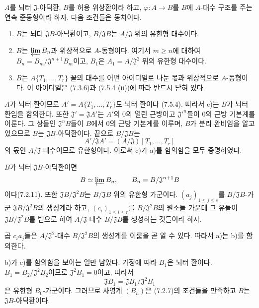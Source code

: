 \begin{proposition}[7.5.5]
\label{0.7.5.5-ko}
$A$를 뇌터 $\mathfrak J$-아딕환, $B$를 허용 위상환이라 하고,
$\varphi:A\to B$를 $B$에 $A$-대수 구조를 주는 연속 준동형이라
하자. 다음 조건들은 동치이다.
\begin{enumerate}
  \item[a)] $B$는 뇌터 $\mathfrak JB$-아딕환이고,
    $B/\mathfrak JB$는 $A/\mathfrak J$ 위의 유한형 대수이다.

  \item[b)] $B$는 $\varprojlim B_n$과 위상적으로 $A$-동형이다.
    여기서 $m\geq n$에 대하여
    $B_n=B_m/\mathfrak J^{n+1}B_m$이고, $B_1$은
    $A_1=A/\mathfrak J^2$ 위의 유한형 대수이다.

  \item[c)] $B$는 $A\{T_1,\ldots,T_r\}$ 꼴의 대수를 어떤
    아이디얼로 나눈 몫과 위상적으로 $A$-동형이다. 이 아이디얼은
    (7.3.6)과 (7.5.4 (ii))에 따라 반드시 닫혀 있다.
\end{enumerate}
\end{proposition}

$A$가 뇌터 환이므로 $A'=A\{T_1,\ldots,T_r\}$도 뇌터 환이다
(7.5.4). 따라서 c)는 $B$가 뇌터 환임을 함의한다. 또한
$\mathfrak J'=\mathfrak JA'$는 $A'$의 $0$의 열린 근방이고
$\mathfrak J'^{n}$들이 $0$의 근방 기본계를 이룬다. 그 상들인
$\mathfrak J^nB$들이 $B$에서 $0$의 근방 기본계를 이루며, $B$가
분리 완비임을 알고 있으므로 $B$는 $\mathfrak JB$-아딕환이다.
끝으로 $B/\mathfrak JB$는
\[
  A'/\mathfrak JA'=(A/\mathfrak J)[T_1,\ldots,T_r]
\]
의 몫인 $A/\mathfrak J$-대수이므로 유한형이다. 이로써 c)가 a)를
함의함을 모두 증명하였다.

$B$가 뇌터 $\mathfrak JB$-아딕환이면
\[
  B\simeq\varprojlim B_n,
  \qquad B_n=B/\mathfrak J^{n+1}B
\]
이다(7.2.11). 또한
$\mathfrak JB/\mathfrak J^2B$는 $B/\mathfrak JB$ 위의 유한형
가군이다. $(a_j)_{1\leq j\leq s}$를
$B/\mathfrak JB$-가군 $\mathfrak JB/\mathfrak J^2B$의 생성계라
하고, $(c_i)_{1\leq i\leq r}$를 $B/\mathfrak J^2B$의 원소들
가운데 그 유들이 $\mathfrak JB/\mathfrak J^2B$를 법으로 하여
$A/\mathfrak J$-대수 $B/\mathfrak JB$를 생성하는 것들이라 하자.


곱 $c_i a_j$들은 $A/\mathfrak J^2$-대수
$B/\mathfrak J^2B$의 생성계를 이룸을 곧 알 수 있다. 따라서 a)는
b)를 함의한다.

b)가 c)를 함의함을 보이는 일만 남았다. 가정에 따라 $B_1$은 뇌터
환이다. $B_1=B_2/\mathfrak J^2B_2$이므로
$\mathfrak J^2B_1=0$이고, 따라서
\[
  \mathfrak JB_1
  =\mathfrak JB_1/\mathfrak J^2B_1
\]
은 유한형 $B_0$-가군이다. 그러므로 사영계 $(B_n)$은 (7.2.7)의
조건들을 만족하고 $B$는 $\mathfrak JB$-아딕환이다.

